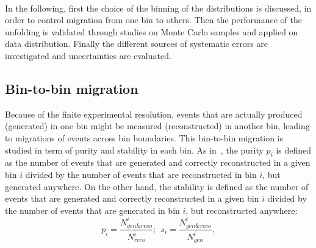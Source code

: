 \\
In the following, first the choice of the binning of the distributions is discussed, in order to control migration from one bin to others. Then the performance of the unfolding is validated through studies on Monte Carlo samples and applied on data distribution. Finally the different sources of systematic errors are investigated and  uncertainties are evaluated.

\subsection{Bin-to-bin migration}
Because of the finite experimental resolution, events that are actually produced (generated) in one bin might be measured (reconstructed) in another bin, leading to migrations of events across bin boundaries. This bin-to-bin migration is studied in term of
purity and stability in each bin. As in~\cite{SMP-14-016}, the purity $p_i$ is defined as the number of events that are
generated and correctly reconstructed in a given bin $i$ divided by the number of events that are reconstructed in bin $i$, 
but generated anywhere. On the other hand, the stability is defined as the number of events that are
generated and correctly reconstructed in a given bin $i$ divided by the number of events that are generated in bin $i$, but 
reconstructed anywhere:
$$p_i=\frac{N^i_{gen\&reco}}{N_{reco}^i}; \ \ s_i=\frac{N^i_{gen\&reco}}{N_{gen}^i},$$

